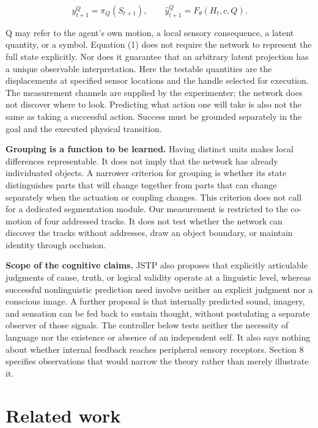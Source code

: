 \documentclass[11pt]{article}
\begin{document}
\begin{equation*}
y^Q_{t+1}=\pi_Q(S_{t+1}),\qquad \hat y^Q_{t+1}=F_\theta(H_t,c,Q).\tag{1}
\end{equation*}

Q may refer to the agent's own motion, a local sensory consequence, a latent quantity, or a symbol. Equation (1) does not require the network to represent the full state explicitly. Nor does it guarantee that an arbitrary latent projection has a unique observable interpretation. Here the testable quantities are the displacements at specified sensor locations and the handle selected for execution. The measurement channels are supplied by the experimenter; the network does not discover where to look. Predicting what action one will take is also not the same as taking a successful action. Success must be grounded separately in the goal and the executed physical transition.

\textbf{Grouping is a function to be learned.} Having distinct units makes local differences representable. It does not imply that the network has already individuated objects. A narrower criterion for grouping is whether its state distinguishes parts that will change together from parts that can change separately when the actuation or coupling changes. This criterion does not call for a dedicated segmentation module. Our measurement is restricted to the co-motion of four addressed tracks. It does not test whether the network can discover the tracks without addresses, draw an object boundary, or maintain identity through occlusion.

\textbf{Scope of the cognitive claims.} JSTP also proposes that explicitly articulable judgments of cause, truth, or logical validity operate at a linguistic level, whereas successful nonlinguistic prediction need involve neither an explicit judgment nor a conscious image. A further proposal is that internally predicted sound, imagery, and sensation can be fed back to sustain thought, without postulating a separate observer of those signals. The controller below tests neither the necessity of language nor the existence or absence of an independent self. It also says nothing about whether internal feedback reaches peripheral sensory receptors. Section 8 specifies observations that would narrow the theory rather than merely illustrate it.

\FloatBarrier\section{Related work}
\end{document}
